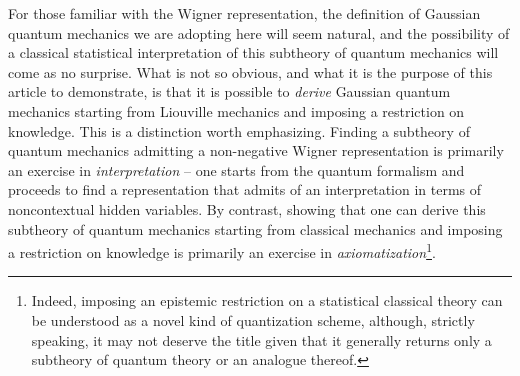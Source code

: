 \documentclass[pra,superscriptaddress,nofootinbib,12pt]{revtex4-2}
\begin{document}
For those familiar with the Wigner representation, the definition of Gaussian quantum mechanics we are adopting here will seem natural, and the possibility of a classical statistical interpretation of this subtheory of quantum mechanics will come as no surprise.
What is not so obvious, and what it is the purpose of this article to demonstrate, is
that it is possible to \emph{derive} Gaussian quantum mechanics starting
from Liouville mechanics and imposing a restriction on knowledge.  This is
a distinction worth emphasizing. Finding a subtheory of quantum mechanics
admitting a non-negative Wigner representation is primarily an exercise in \emph{interpretation} -- one starts from the quantum formalism and proceeds to find a representation that admits of an interpretation in terms of noncontextual hidden variables. By contrast, showing that one can derive
this subtheory of quantum mechanics starting from classical mechanics and
imposing a restriction on knowledge is primarily an exercise in \emph{axiomatization}\footnote{Indeed, imposing an epistemic restriction on a statistical classical theory can be understood as a novel kind of quantization scheme, although, strictly speaking, it may not deserve the title given that it generally returns only a subtheory of quantum theory or an analogue thereof.}.
\end{document}
